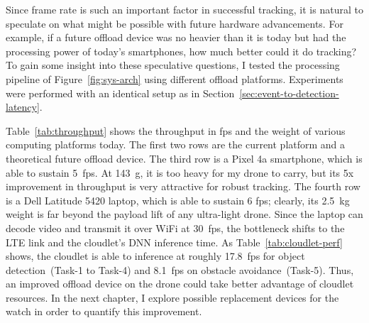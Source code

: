 Since frame rate is such an important factor in successful tracking,
it is natural to speculate on what might be possible with future
hardware advancements.  For example, if a future offload device was no heavier
than it is today but had the processing power of today's smartphones,
how much better could it do tracking?  To gain some insight into these
speculative questions, I tested the processing pipeline of
Figure~\ref{fig:sys-arch} using different offload platforms.  Experiments were performed with an identical setup as in Section~\ref{sec:event-to-detection-latency}.

Table~\ref{tab:throughput} shows the throughput in fps and the weight
of various computing platforms today. The first two rows are the
current platform and a theoretical future offload device.  The third row is a Pixel 4a smartphone, which is able to sustain 5~fps. At 143~g, it is too heavy
for my drone to carry, but its 5x improvement in throughput is very
attractive for robust tracking. The fourth row is a Dell Latitude 5420
laptop, which is able to sustain 6 fps; clearly, its 2.5~kg weight is
far beyond the payload lift of any ultra-light drone.  Since the
laptop can decode video and transmit it over WiFi at 30~fps, the
bottleneck shifts to the LTE link and the cloudlet's DNN inference
time.  As Table~\ref{tab:cloudlet-perf} shows, the cloudlet is able
to inference at roughly 17.8~fps for object detection~(Task-1 to
Task-4) and 8.1~fps on obstacle avoidance~(Task-5). Thus, an improved offload device on the drone could take better advantage of cloudlet resources. In the next chapter, I explore possible replacement devices for the watch in order to quantify this improvement.




